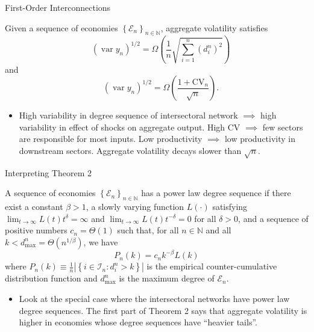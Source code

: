 \documentclass[dvipsnames]{beamer}
\begin{document}
%
\begin{frame}{First-Order Interconnections}
  \begin{theorem}[Theorem 2]
    Given a sequence of economies $\left\{\mathcal{E}_{n}\right\}_{n \in \mathbb{N}}$, aggregate volatility satisfies
    \[\quad\left(\operatorname{var} y_{n}\right)^{1 / 2}=\Omega\left(\frac{1}{n} \sqrt{\sum_{i=1}^{n}\left(d_{i}^{n}\right)^{2}}\right)\]
    and
    \[\quad\left(\operatorname{var} y_{n}\right)^{1 / 2}=\Omega\left(\frac{1+\mathrm{CV}_{n}}{\sqrt{n}}\right).
    \]
  \end{theorem}
  \begin{itemize}
  \item High variability in degree sequence of intersectoral network $\implies$ high variability in effect of shocks on aggregate output.
    \vitem High CV $\implies$  few sectors are responsible for most inputs.
    \vitem Low productivity $\implies$ low productivity in downstream sectors.
    \vitem Aggregate volatility decays slower than $\sqrt{n}$.
  \end{itemize}
\end{frame}
%
\begin{frame}{Interpreting Theorem 2}
  \begin{definition}
     A sequence of economies $\left\{\mathcal{E}_{n}\right\}_{n \in \mathbb{N}}$ has a power law degree sequence if there exist a constant $\beta>1$, a slowly varying function $L(\cdot)$ satisfying $\lim _{t \rightarrow \infty} L(t) t^{\delta}=\infty$ and $\lim _{t \rightarrow \infty} L(t) t^{-\delta}=0$ for all $\delta>0$, and a sequence of positive numbers $c_{n}=\Theta(1)$ such that, for all $n \in \mathbb{N}$ and all $k<d_{\max }^{n}=\Theta\left(n^{1 / \beta}\right)$, we have
$$
P_{n}(k)=c_{n} k^{-\beta} L(k)
$$
where $P_{n}(k) \equiv \frac{1}{n}\left|\left\{i \in \mathcal{I}_{n}: d_{i}^{n}>k\right\}\right|$ is the empirical counter-cumulative distribution function and $d_{\max }^{n}$ is the maximum degree of $\mathcal{E}_{n}$.
  \end{definition}
  \begin{itemize}
  \item Look at the special case where the intersectoral networks have power law degree sequences.
    \vitem The first part of Theorem 2 says that aggregate volatility is higher in economies whose degree sequences have ``heavier tails''.
  \end{itemize}
\end{frame}
%
\end{document}
